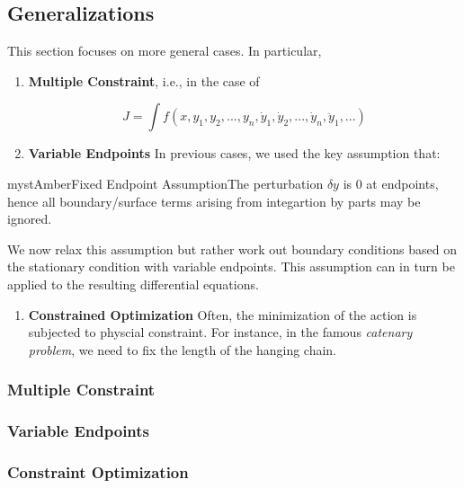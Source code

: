\subsection{Generalizations}

This section focuses on more general cases. In particular,

\begin{enumerate}
\item \textbf{Multiple Constraint}, i.e., in the case of

\begin{equation}
J=\int f(x,y_1,y_2,...,y_n,\dot y_1, \dot y_2,...,\dot y_n, \ddot y_1,...)
\end{equation}


\item \textbf{Variable Endpoints}
In previous cases, we used the key assumption that:
\end{enumerate}

\begin{mystadmonition}{mystAmber}{Fixed Endpoint Assumption}The perturbation $\delta y$ is 0 at endpoints, hence all boundary/surface terms arising from integartion by parts may be ignored.

\end{mystadmonition}
We now relax this assumption but rather work out boundary conditions based on the stationary condition with variable endpoints. This assumption can in turn be applied to the resulting differential equations.

\begin{enumerate}[resume]
\item \textbf{Constrained Optimization} Often, the minimization of the action is subjected to physcial constraint. For instance, in the famous \textit{catenary problem}, we need to fix the length of the hanging chain.
\end{enumerate}

\subsubsection{Multiple Constraint}

\subsubsection{Variable Endpoints}

\subsubsection{Constraint Optimization}

